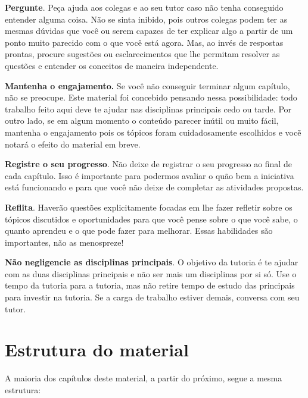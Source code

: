 {\textbf{Pergunte}. Peça ajuda aos colegas e ao seu tutor caso não tenha conseguido entender alguma coisa. Não se sinta inibido, pois outros colegas podem ter as mesmas dúvidas que você ou serem capazes de ter explicar algo a partir de um ponto muito parecido com o que você está agora. Mas, ao invés de respostas prontas, procure sugestões ou esclarecimentos que lhe permitam resolver as questões e entender os conceitos de maneira independente.

\textbf{Mantenha o engajamento.} Se você não conseguir terminar algum capítulo, não se preocupe. Este material foi concebido pensando nessa possibilidade: todo trabalho feito aqui deve te ajudar nas disciplinas principais cedo ou tarde. Por outro lado, se em algum momento o conteúdo parecer inútil ou muito fácil, mantenha o engajamento pois os tópicos foram cuidadosamente escolhidos e vocẽ notará o efeito do material em breve.

\textbf{Registre o seu progresso}. Não deixe de registrar o seu progresso ao final de cada capítulo. Isso é importante para podermos avaliar o quão bem a iniciativa está funcionando e para que você não deixe de completar as atividades propostas.

\textbf{Reflita}. Haverão questões explicitamente focadas em lhe fazer refletir sobre os tópicos discutidos e oportunidades para que você pense sobre o que você sabe, o quanto aprendeu e o que pode fazer para melhorar. Essas habilidades são importantes, não as menospreze! 

\textbf{Não negligencie as disciplinas principais}. O objetivo da tutoria é te ajudar com as duas disciplinas principais e não ser mais um disciplinas por si só. Use o tempo da tutoria para a tutoria, mas não retire tempo de estudo das principais para investir na tutoria. Se a carga de trabalho estiver demais, conversa com seu tutor.

\section{Estrutura do material}

A maioria dos capítulos deste material, a partir do próximo, segue a mesma estrutura:

}
